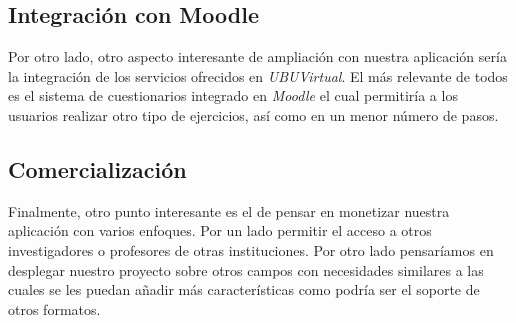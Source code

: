 \subsection{Integración con Moodle}
Por otro lado, otro aspecto interesante de ampliación con nuestra aplicación sería la integración de los servicios ofrecidos en \textit{UBUVirtual}. El más relevante de todos es el sistema de cuestionarios integrado en \textit{Moodle} el cual permitiría a los usuarios realizar otro tipo de ejercicios, así como en un menor número de pasos.

\subsection{Comercialización}
Finalmente, otro punto interesante es el de pensar en monetizar nuestra aplicación con varios enfoques. Por un lado permitir el acceso a otros investigadores o profesores de otras instituciones.
Por otro lado pensaríamos en desplegar nuestro proyecto sobre otros campos con necesidades similares a las cuales se les puedan añadir más características como podría ser el soporte de otros formatos.